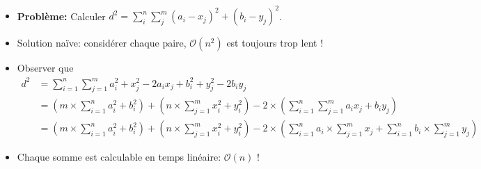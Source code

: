 \begin{frame}
    \frametitle{\problemtitle}
    \begin{itemize}
        \item<+-> \textbf{Problème:} Calculer $d^2 = \sum_i^n \sum_j^m (a_i - x_j)^2 + (b_i - y_j)^2$.
        \item<+-> Solution naïve: considérer chaque paire, $\mathcal O(n^2)$ est toujours trop lent !
        \item<+-> Observer que
            \begin{equation*}
            \begin{split}
            d^2 & = \sum_{i=1}^n \sum_{j=1}^m a_i^2 + x_j^2 - 2 a_i x_j + b_i^2 + y_j^2 - 2 b_i y_j \\
                & = \left( m \times \sum_{i=1}^n a_i^2 + b_i^2 \right) + \left( n \times \sum_{j=1}^m x_i^2 + y_i^2 \right) - 2 \times \left( \sum_{i=1}^n \sum_{j=1}^m a_i x_j + b_i y_j \right) \\
                & = \left( m \times \sum_{i=1}^n a_i^2 + b_i^2 \right) + \left( n \times \sum_{j=1}^m x_i^2 + y_i^2 \right) - 2 \times \left( \sum_{i=1}^n a_i \times \sum_{j=1}^m x_j + \sum_{i=1}^n b_i \times \sum_{j=1}^m y_j \right)
            \end{split}
            \end{equation*}
        \item<+-> Chaque somme est calculable en temps linéaire: $\mathcal{O}(n)$ !
    \end{itemize}
\end{frame}
